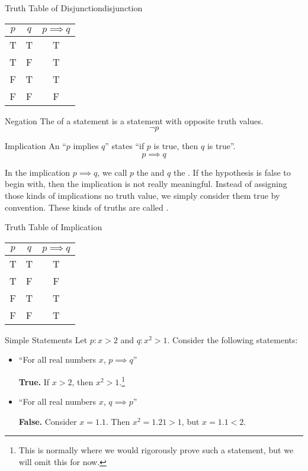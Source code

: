 \begin{exbox}{Truth Table of Disjunction}{disjunction}
    \begin{center}\begin{tabular}{c | c || c}
        $p$ & $q$ & $p \implies q$ \\ \hline
        T & T & T \\
        T & F & T \\
        F & T & T \\
        F & F & F
    \end{tabular}\end{center}
\end{exbox}



\begin{dfnbox}{Negation}{}
    The  of a statement is a statement with opposite truth values.
    \tcblower
    \[ \neg p \]
\end{dfnbox}

\begin{dfnbox}{Implication}{}
    An  ``$p$ implies $q$'' states ``if $p$ is true, then $q$ is true''.
    \tcblower
    \[ p \implies q \]
\end{dfnbox}

In the implication $p \implies q$, we call $p$ the  and $q$ the . If the hypothesis is false to begin with, then the implication is not really meaningful. Instead of assigning those kinds of implications no truth value, we simply consider them true by convention. These kinds of truths are called .

\begin{exbox}{Truth Table of Implication}{}
    \begin{center}\begin{tabular}{c | c || c}
        $p$ & $q$ & $p \implies q$ \\ \hline
        T & T & T \\
        T & F & F \\
        F & T & T \\
        F & F & T
    \end{tabular}\end{center}
\end{exbox}

\begin{exbox}{Simple Statements}{}
    Let $p : x > 2$ and $q : x^2 > 1$. Consider the following statements:
    \begin{itemize}
        \item ``For all real numbers $x$, $p \implies q$''

        \textbf{True.} If $x > 2$, then $x^2 > 1$.\footnote{This is normally where we would rigorously prove such a statement, but we will omit this for now.}

        \item ``For all real numbers $x$, $q \implies p$''

        \textbf{False.} Consider $x = 1.1$. Then $x^2 = 1.21 > 1$, but $x = 1.1 < 2$.
    \end{itemize}
\end{exbox}


